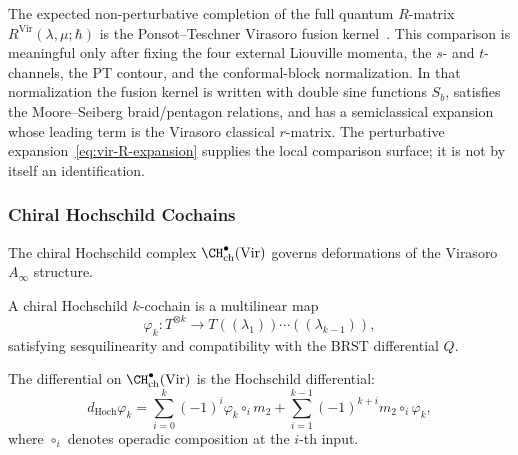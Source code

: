 \begin{remark}
The expected non-perturbative completion of the full quantum
$R$-matrix $R^{\text{Vir}}(\lambda,\mu;\hbar)$ is the
Ponsot--Teschner Virasoro fusion kernel~\cite{PT01}. This comparison
is meaningful only after fixing the four external Liouville momenta,
the $s$- and $t$-channels, the PT contour, and the conformal-block
normalization. In that normalization the fusion kernel is written with
double sine functions $S_b$, satisfies the Moore--Seiberg
braid/pentagon relations, and has a semiclassical expansion whose
leading term is the Virasoro classical $r$-matrix. The perturbative
expansion~\eqref{eq:vir-R-expansion} supplies the local comparison
surface; it is not by itself an identification.
\end{remark}

\subsubsection{Chiral Hochschild Cochains}

The chiral Hochschild complex $\CH^\bullet_{\text{ch}}(\text{Vir})$ governs deformations of the Virasoro $A_\infty$ structure.

\begin{definition}
A chiral Hochschild $k$-cochain is a multilinear map
\begin{equation}
\varphi_k: T^{\otimes k} \to T((\lambda_1))\cdots((\lambda_{k-1})),
\end{equation}
satisfying sesquilinearity and compatibility with the BRST differential $Q$.
\end{definition}

The differential on $\CH^\bullet_{\text{ch}}(\text{Vir})$ is the Hochschild differential:
\begin{equation}
d_{\text{Hoch}} \varphi_k = \sum_{i=0}^k (-1)^i \varphi_k \circ_i m_2 + \sum_{i=1}^{k-1} (-1)^{k+i} m_2 \circ_i \varphi_k,
\end{equation}
where $\circ_i$ denotes operadic composition at the $i$-th input.

